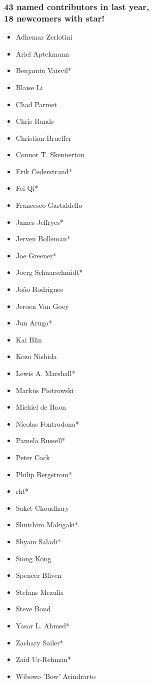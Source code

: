 \begin{frame}
  \frametitle{43 named contributors in last year, \\ 18 newcomers with star!}
  \scriptsize{
  \begin{multicols}{3}
  \begin{itemize}
    \item Adhemar Zerlotini
    \item Ariel Aptekmann
    \item Benjamin Vaisvil*
    \item Blaise Li
    \item Chad Parmet
    \item Chris Rands
    \item Christian Brueffer
    \item Connor T. Skennerton
    \item Erik Cederstrand*
    \item Fei Qi*
    \item Francesco Gastaldello
    \item James Jeffryes*
    \item Jerven Bolleman*
    \item Joe Greener*
    \item Joerg Schaarschmidt*
    \item João Rodrigues
    \item Jeroen Van Goey
    \item Jun Aruga*
    \item Kai Blin
    \item Kozo Nishida
    \item Lewis A. Marshall*
    \item Markus Piotrowski
    \item Michiel de Hoon
    \item Nicolas Fontrodona*
    \item Pamela Russell*
    \item Peter Cock
    \item Philip Bergstrom*
    \item rht*
    \item Saket Choudhary
    \item Shuichiro Makigaki*
    \item Shyam Saladi*
    \item Siong Kong
    \item Spencer Bliven
    \item Stefans Mezulis
    \item Steve Bond
    \item Yasar L. Ahmed*
    \item Zachary Sailer*
    \item Zaid Ur-Rehman*
    \item Wibowo 'Bow' Arindrarto
  \end{itemize}
  \end{multicols}
  }
\end{frame}


